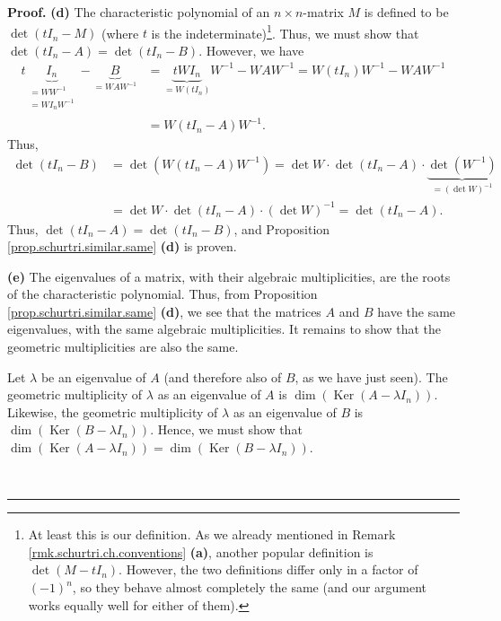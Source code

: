 \documentclass[numbers=enddot,12pt,final,onecolumn,notitlepage]{scrartcl}%
\numberwithin{exer}{subsection}
\theoremstyle{definition}
\newenvironment{proof}[1][Proof]{\noindent\textbf{#1.} }{\ \rule{0.5em}{0.5em}}
\begin{document}
\begin{proof}
\textbf{(d)} The characteristic polynomial of an $n\times n$-matrix $M$ is
defined to be $\det\left(  tI_{n}-M\right)  $ (where $t$ is the
indeterminate)\footnote{At least this is our definition. As we already
mentioned in Remark \ref{rmk.schurtri.ch.conventions} \textbf{(a)}, another
popular definition is $\det\left(  M-tI_{n}\right)  $. However, the two
definitions differ only in a factor of $\left(  -1\right)  ^{n}$, so they
behave almost completely the same (and our argument works equally well for
either of them).}. Thus, we must show that $\det\left(  tI_{n}-A\right)
=\det\left(  tI_{n}-B\right)  $. However, we have%
\begin{align*}
t\underbrace{I_{n}}_{\substack{=WW^{-1}\\=WI_{n}W^{-1}}}-\underbrace{B}%
_{=WAW^{-1}} &  =\underbrace{tWI_{n}}_{=W\left(  tI_{n}\right)  }%
W^{-1}-WAW^{-1}=W\left(  tI_{n}\right)  W^{-1}-WAW^{-1}\\
&  =W\left(  tI_{n}-A\right)  W^{-1}.
\end{align*}
Thus,%
\begin{align*}
\det\left(  tI_{n}-B\right)   &  =\det\left(  W\left(  tI_{n}-A\right)
W^{-1}\right)  =\det W\cdot\det\left(  tI_{n}-A\right)  \cdot\underbrace{\det
\left(  W^{-1}\right)  }_{=\left(  \det W\right)  ^{-1}}\\
&  =\det W\cdot\det\left(  tI_{n}-A\right)  \cdot\left(  \det W\right)
^{-1}=\det\left(  tI_{n}-A\right)  .
\end{align*}
Thus, $\det\left(  tI_{n}-A\right)  =\det\left(  tI_{n}-B\right)  $, and
Proposition \ref{prop.schurtri.similar.same} \textbf{(d)} is proven. \medskip

\textbf{(e)} The eigenvalues of a matrix, with their algebraic multiplicities,
are the roots of the characteristic polynomial. Thus, from Proposition
\ref{prop.schurtri.similar.same} \textbf{(d)}, we see that the matrices $A$
and $B$ have the same eigenvalues, with the same algebraic multiplicities. It
remains to show that the geometric multiplicities are also the same.

Let $\lambda$ be an eigenvalue of $A$ (and therefore also of $B$, as we have
just seen). The geometric multiplicity of $\lambda$ as an eigenvalue of $A$ is
$\dim\left(  \operatorname*{Ker}\left(  A-\lambda I_{n}\right)  \right)  $.
Likewise, the geometric multiplicity of $\lambda$ as an eigenvalue of $B$ is
$\dim\left(  \operatorname*{Ker}\left(  B-\lambda I_{n}\right)  \right)  $.
Hence, we must show that $\dim\left(  \operatorname*{Ker}\left(  A-\lambda
I_{n}\right)  \right)  =\dim\left(  \operatorname*{Ker}\left(  B-\lambda
I_{n}\right)  \right)  $.


\end{proof}
\end{document}
